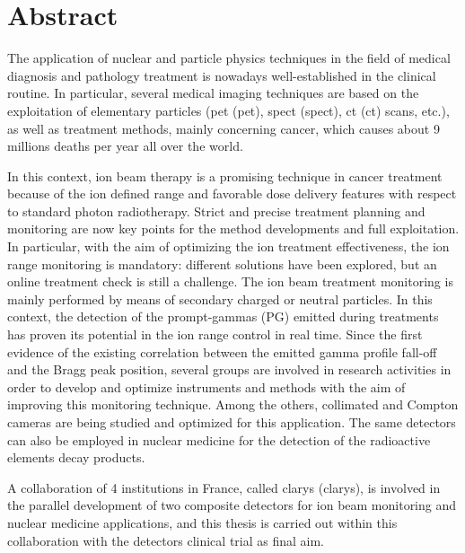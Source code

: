 \chapter*{Abstract}

\glsresetall


The application of nuclear and particle physics techniques in the field of medical diagnosis and pathology treatment is nowadays well-established in the clinical routine. In particular, several medical imaging techniques are based on the exploitation of elementary particles (\glsdesc{pet} (\gls{pet}), \glsdesc{spect} (\gls{spect}), \glsdesc{ct} (\gls{ct}) scans,  etc.), as well as treatment methods, mainly concerning cancer, which causes about 9 millions deaths per year all over the world.
     
In this context, ion beam therapy is a promising technique in cancer treatment because of the ion defined range and favorable dose delivery features with respect to standard photon radiotherapy. Strict and precise treatment planning and monitoring are now key points for the method developments and full exploitation. In particular, with the aim of optimizing the ion treatment effectiveness, the ion range monitoring is mandatory: different solutions have been explored, but an online treatment check is still a challenge. 
The ion beam treatment monitoring is mainly performed by means of secondary charged or neutral particles. In this context, the detection of the prompt-gammas (PG) emitted during treatments has proven its potential in the ion range control in real time. Since the first evidence of the existing correlation between the emitted gamma profile fall-off and the Bragg peak position, several groups are involved in research activities in order to develop and optimize instruments and methods with the aim of improving this monitoring technique.  Among the others, collimated and Compton cameras are being studied and optimized for this application. The same detectors can also be employed in nuclear medicine for the detection of the radioactive elements decay products.      

A collaboration of 4 institutions in France, called \glsdesc{clarys} (\gls{clarys}), is involved in the parallel development of two composite detectors for ion beam monitoring and nuclear medicine applications, and this thesis is carried out within this collaboration with the detectors clinical trial as final aim.


